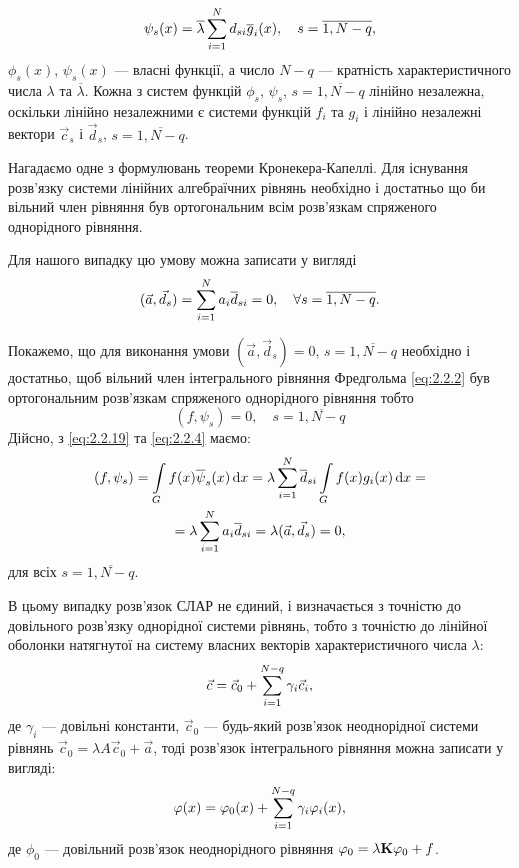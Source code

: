 \begin{equation}
	\label{eq:2.2.19}
	\psi_s(x) = \overline \lambda \Sum_{i = 1}^N d_{si} \overline g_i(x), \quad s = \overline{1, N - q},
\end{equation}
$\phi_s(x)$, $\psi_s(x)$ --- власні функції, а число $N - q$ --- кратність характеристичного числа $\lambda$ та $\overline \lambda$. Кожна з систем функцій $\phi_s$, $\psi_s$, $s = \overline{1, N - q}$ лінійно незалежна, оскільки лінійно незалежними є системи функцій $f_i$ та $g_i$ і лінійно незалежні вектори $\vec c_s$ і $\vec d_s$, $s = \overline{1, N - q}$. \medskip

Нагадаємо одне з формулювань теореми Кронекера-Капеллі. Для існування розв'язку системи лінійних алгебраїчних рівнянь необхідно і достатньо що би вільний член рівняння був ортогональним всім розв'язкам спряженого однорідного рівняння. \medskip

Для нашого випадку цю умову можна записати у вигляді
\begin{equation}
	\label{eq:2.2.20}
	(\vec a, \vec d_s) = \Sum_{i = 1}^N a_i \overline d_{si} = 0, \quad \forall s = \overline{1, N - q}.
\end{equation}

Покажемо, що для виконання умови $(\vec a, \vec d_s) = 0$, $s = \overline{1, N - q}$ необхідно і достатньо, щоб вільний член інтегрального рівняння Фредгольма \eqref{eq:2.2.2} був ортогональним розв'язкам спряженого однорідного рівняння тобто 
\begin{equation}
	\label{eq:2.2.21}
	(f, \psi_s) = 0, \quad s = \overline{1, N - q}
\end{equation}
Дійсно, з \eqref{eq:2.2.19} та \eqref{eq:2.2.4} маємо:
\begin{multline*} (f, \psi_s) = \Int_G f(x) \overline \psi_s (x) \diff x = \lambda \Sum_{i = 1}^N \overline d_{si} \Int_G f(x) g_i(x) \diff x = \\ = \lambda \Sum_{i = 1}^N a_i \overline d_{si} = \lambda (\vec a, \vec d_s) = 0, \end{multline*} для всіх $s = \overline{1, N - q}$. \medskip

В цьому випадку розв'язок СЛАР не єдиний, і визначається з точністю до довільного розв'язку однорідної системи рівнянь, тобто з точністю до лінійної оболонки натягнутої на систему власних векторів характеристичного числа $\lambda$:
\begin{equation}
	\label{eq:2.2.22}
	\vec c = \vec c_0 + \Sum_{i = 1}^{N - q} \gamma_i \vec c_i,
\end{equation}
де $\gamma_i$ --- довільні константи, $\vec c_0$ --- будь-який розв'язок неоднорідної системи рівнянь $\vec c_0 = \lambda A \vec c_0 + \vec a$, тоді розв'язок інтегрального рівняння можна записати у вигляді:
\begin{equation}
	\label{eq:2.2.23}
	\phi(x) = \phi_0(x) + \Sum_{i = 1}^{N - q} \gamma_i \phi_i(x),
\end{equation}
де $\phi_0$ --- довільний розв'язок неоднорідного рівняння $\phi_0 = \lambda \bf{K} \phi_0 + f$. \medskip


